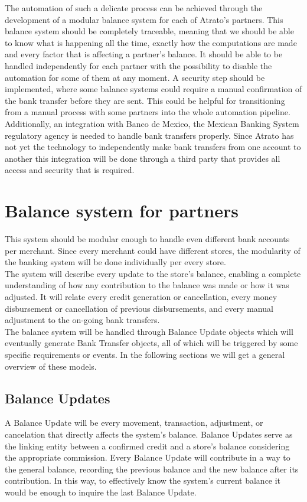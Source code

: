 The automation of such a delicate process can be achieved through the development of a modular balance system for each of Atrato’s partners. This balance system should be completely traceable, meaning that we should be able to know what is happening all the time, exactly how the computations are made and every factor that is affecting a partner’s balance. It should be able to be handled independently for each partner with the possibility to disable the automation for some of them at any moment. A security step should be implemented, where some balance systems could require a manual confirmation of the bank transfer before they are sent. This could be helpful for transitioning from a manual process with some partners into the whole automation pipeline. \\

Additionally, an integration with Banco de Mexico, the Mexican Banking System regulatory agency is needed to handle bank transfers properly. Since Atrato has not yet the technology to independently make bank transfers from one account to another this integration will be done through a third party that provides all access and security that is required.

\section{Balance system for partners}
This system should be modular enough to handle even different bank accounts per merchant. Since every merchant could have different stores, the modularity of the banking system will be done individually per every store.\\

The system will describe every update to the store’s balance, enabling a complete understanding of how any contribution to the balance was made or how it was adjusted. It will relate every credit generation or cancellation, every money disbursement or cancellation of previous disbursements, and every manual adjustment to the on-going bank transfers.\\

The balance system will be handled through Balance Update objects which will eventually generate Bank Transfer objects, all of which will be triggered by some specific requirements or events. In the following sections we will get a general overview of these models. 

\subsection{Balance Updates}
A Balance Update will be every movement, transaction, adjustment, or cancelation that directly affects the system’s balance. Balance Updates serve as the linking entity between a confirmed credit and a store’s balance considering the appropriate commission. Every Balance Update will contribute in a way to the general balance, recording the previous balance and the new balance after its contribution. In this way, to effectively know the system’s current balance it would be enough to inquire the last Balance Update.\\

